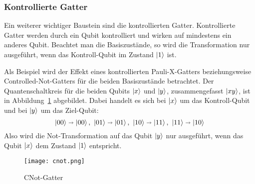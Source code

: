   \vspace{1em}

\subsubsection*{Kontrollierte Gatter}
Ein weiterer wichtiger Baustein sind die kontrollierten Gatter. 
Kontrollierte Gatter werden durch ein Qubit kontrolliert und wirken auf mindestens ein anderes Qubit. 
Beachtet man die Basiszustände, 
so wird die Transformation nur ausgeführt, 
wenn das Kontroll-Qubit im Zustand \(\ket{1}\) ist.

Als Beispiel wird der Effekt eines kontrollierten Pauli-X-Gatters beziehungsweise 
Controlled-Not-Gatters für die beiden Basiszustände betrachtet.
Der Quantenschaltkreis für die beiden Qubits \(\ket{x}\) und \(\ket{y}\), zusammengefasst \(\ket{xy}\), 
ist in Abbildung~\ref{fig:cnot} abgebildet.
Dabei handelt es sich bei \(\ket{x}\) um das Kontroll-Qubit und bei \(\ket{y}\) um das Ziel-Qubit:
\[\ket{00}\shortrightarrow\ket{00},~\ket{01}\shortrightarrow\ket{01},~
\ket{10}\shortrightarrow\ket{11},~\ket{11}\shortrightarrow\ket{10}
  \]
Also wird die Not-Transformation auf das Qubit \(\ket{y}\) nur ausgeführt, 
wenn das Qubit \(\ket{x}\) dem Zustand \(\ket{1}\) entspricht.
\begin{figure}[H]
  \centering
  \texttt{[image: cnot.png]}
  \caption{CNot-Gatter}
  \label{fig:cnot}
\end{figure}


